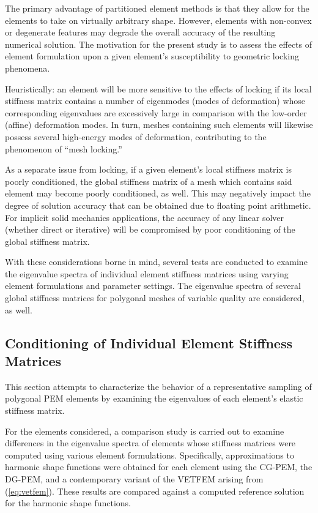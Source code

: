 The primary advantage of partitioned element methods is that they allow for the elements to take on virtually arbitrary shape. However, elements with non-convex or degenerate features may degrade the overall accuracy of the resulting numerical solution. The motivation for the present study is to assess the effects of element formulation upon a given element's susceptibility to geometric locking phenomena.

Heuristically: an element will be more sensitive to the effects of locking if its local stiffness matrix contains a number of eigenmodes (modes of deformation) whose corresponding eigenvalues are excessively large in comparison with the low-order (affine) deformation modes. In turn, meshes containing such elements will likewise possess several high-energy modes of deformation, contributing to the phenomenon of ``mesh locking.''

As a separate issue from locking, if a given element's local stiffness matrix is poorly conditioned, the global stiffness matrix of a mesh which contains said element may become poorly conditioned, as well. This may negatively impact the degree of solution accuracy that can be obtained due to floating point arithmetic. For implicit solid mechanics applications, the accuracy of any linear solver (whether direct or iterative) will be compromised by poor conditioning of the global stiffness matrix.

With these considerations borne in mind, several tests are conducted to examine the eigenvalue spectra of individual element stiffness matrices using varying element formulations and parameter settings. The eigenvalue spectra of several global stiffness matrices for polygonal meshes of variable quality are considered, as well.

\subsection*{Conditioning of Individual Element Stiffness Matrices}

This section attempts to characterize the behavior of a representative sampling of polygonal PEM elements by examining the eigenvalues of each element's elastic stiffness matrix.

For the elements considered, a comparison study is carried out to examine differences in the eigenvalue spectra of elements whose stiffness matrices were computed using various element formulations. Specifically, approximations to harmonic shape functions were obtained for each element using the CG-PEM, the DG-PEM, and a contemporary variant of the VETFEM arising from (\ref{eq:vetfem}). These results are compared against a computed reference solution for the harmonic shape functions.

